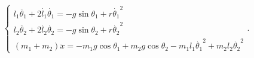 \documentclass[preview, convert={outfile=\jobname.svg}]{standalone}
\begin{document}
\begin{equation*}
    \begin{cases}
            l_1\ddot{\theta_1} + 2\dot{l_1}\dot{\theta_1} = -g\sin\theta_1 + r\dot{\theta_1}^2 \\
            l_2\ddot{\theta_2} + 2\dot{l_2}\dot{\theta_2} = -g\sin\theta_2 + r\dot{\theta_2}^2 \\
                (m_1 + m_2)\ddot{x} = -m_1g\cos\theta_1 + m_2g\cos\theta_2 - m_1l_1\dot{\theta_1}^2 + m_2l_2\dot{\theta_2}^2
    \end{cases}\!\!\!.
\end{equation*}
\end{document}
